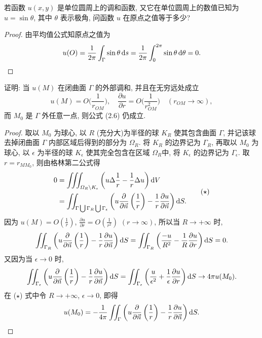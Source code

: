 \begin{exercise}
  若函数 $u(x,y)$ 是单位圆周上的调和函数, 又它在单位圆周上的数值已知为 $u=\sin\theta$,
  其中 $\theta$ 表示极角, 问函数 $u$ 在原点之值等于多少?
\end{exercise}

\begin{proof}
  由平均值公式知原点之值为
  \[u(O) = \frac{1}{2\pi}\int_{\Gamma}\sin\theta\mathop{}\!\mathrm{d} s
    = \frac{1}{2\pi}\int_0^{2\pi}\sin\theta\mathop{}\!\mathrm{d}\theta = 0.\qedhere\]
\end{proof}


\begin{exercise}[4]
  证明: 当 $u(M)$ 在闭曲面 $\Gamma$ 的外部调和, 并且在无穷远处成立
  \[u(M) = O\biggl(\frac{1}{r_{OM}}\biggr),\quad
    \frac{\partial u}{\partial r} = O\biggl(\frac{1}{r_{OM}^2}\biggr)\quad
    (r_{OM}\to\infty),\]
  而 $M_0$ 是 $\Gamma$ 外任意一点, 则公式 (2.6) 仍成立.
\end{exercise}

\begin{proof}
  取以 $M_0$ 为球心, 以 $R$ (充分大)为半径的球 $K_R$ 使其包含曲面 $\Gamma$,
  并记该球去掉闭曲面 $\Gamma$ 内部区域后得到的部分为 $\varOmega_R$. 将 $K_R$ 的边界记为 $\Gamma_R$,
  再取以 $M_0$ 为球心, 以 $\epsilon$ 为半径的球 $K_{\epsilon}$ 使其完全包含在区域 $\varOmega_R$中,
  将 $K_{\epsilon}$ 的边界记为 $\Gamma_{\epsilon}$.
  取 $r=r_{MM_0}$, 则由格林第二公式得
  \begin{equation}
    \begin{aligned}
    0 & = \iiint_{\varOmega_R\backslash K_{\epsilon}}\left(u\Delta\frac{1}{r}
        - \frac{1}{r}\Delta u\right)\mathop{}\!\mathrm{d} V \\
      & = \iint_{\Gamma\bigcup\Gamma_R\bigcup\Gamma_{\epsilon}}\left(u\frac{\partial}{\partial\vec{n}}\left(\frac{1}{r}\right)-\frac{1}{r}\frac{\partial u}{\partial\vec{n}}\right)\mathop{}\!\mathrm{d} S.
    \end{aligned} \tag{$\star$}
  \end{equation}
  因为 $u(M)=O(\frac{1}{r})$, $\frac{\partial u}{\partial r}=O(\frac{1}{r^2})$ $(r\to\infty)$,
  所以当 $R\to +\infty$ 时,
  \[\iint_{\Gamma_R}\left(u\frac{\partial}{\partial\vec{n}}\left(\frac{1}{r}\right)
    - \frac{1}{r}\frac{\partial u}{\partial\vec{n}}\right)\mathop{}\!\mathrm{d} S
    = \iint_{\Gamma_R}\left(\frac{-u}{R^2}-\frac{1}{R}\frac{\partial u}{\partial r}\right)\mathop{}\!\mathrm{d} S = 0.\]
  又因为当 $\epsilon\to 0$ 时,
  \[\iint_{\Gamma_{\epsilon}}\left(u\frac{\partial}{\partial\vec{n}}\left(\frac{1}{r}\right)
    - \frac{1}{r}\frac{\partial u}{\partial\vec{n}}\right)\mathop{}\!\mathrm{d} S
    = \iint_{\Gamma_{\epsilon}}\left(\frac{u}{\epsilon^2}
    + \frac{1}{\epsilon}\frac{\partial u}{\partial r}\right)\mathop{}\!\mathrm{d} S
    \to 4\pi u(M_0).\]
  在 ($\star$) 式中令 $R\to +\infty$, $\epsilon\to 0$, 即得
  \[u(M_0)
  =-\frac{1}{4\pi}\iint_{\Gamma}\left(u\frac{\partial}{\partial\vec{n}}\left(\frac{1}{r}\right)
  -\frac{1}{r}\frac{\partial u}{\partial\vec{n}}\right)\mathop{}\!\mathrm{d} S. \qedhere\]
\end{proof}


